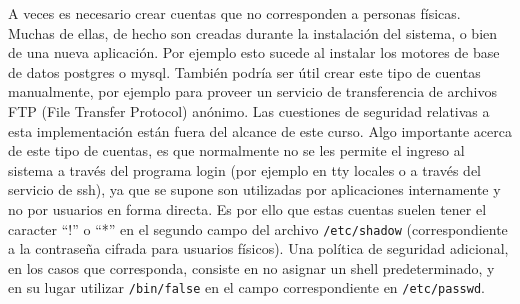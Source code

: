 \documentclass[12pt]{article}
\begin{document}


	
A veces es necesario crear cuentas que no corresponden 
a personas físicas. Muchas de ellas, de hecho son creadas durante la 
instalación del sistema, o bien de una nueva aplicación. Por ejemplo esto 
sucede al instalar los motores de base de datos postgres o mysql. También 
podría ser útil crear este tipo de cuentas manualmente, por ejemplo para 
proveer un servicio de transferencia de archivos FTP (File Transfer Protocol) 
anónimo. Las cuestiones de seguridad relativas a esta implementación están fuera
del alcance de este curso. Algo importante acerca de este tipo de cuentas, es
que normalmente no se les permite el ingreso al sistema a través del programa 
login (por ejemplo en tty locales o a través del servicio de ssh), ya que se 
supone son utilizadas por aplicaciones internamente y no por usuarios en forma 
directa. Es por ello que estas cuentas suelen tener el caracter ``!'' o ``*'' en 
el segundo campo del archivo  \texttt{/etc/shadow} (correspondiente a la contraseña 
cifrada para usuarios físicos). Una política de seguridad adicional, en los 
casos que corresponda, consiste en no asignar un shell predeterminado, y en su lugar
utilizar \texttt{/bin/false} en el campo correspondiente en \texttt{/etc/passwd}.  
\end{document}
